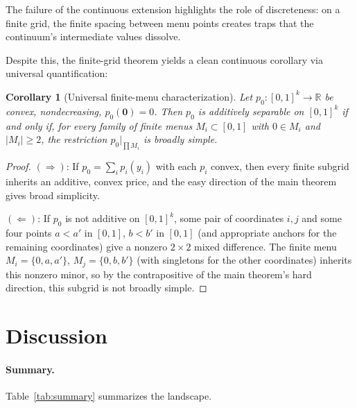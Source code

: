 \documentclass[11pt]{article}
\newtheorem{corollary}[theorem]{Corollary}
\newcommand{\R}{\mathbb{R}}
\begin{document}
The failure of the continuous extension highlights the role of
discreteness: on a finite grid, the finite spacing between menu
points creates traps that the continuum's intermediate values
dissolve.

Despite this, the finite-grid theorem yields a clean continuous
corollary via universal quantification:

\begin{corollary}[Universal finite-menu characterization]%
\label{cor:universal}
Let $p_0\colon [0,1]^k \to \R$ be convex, nondecreasing,
$p_0(\mathbf{0}) = 0$.  Then $p_0$ is additively separable on
$[0,1]^k$ if and only if, for every family of finite menus
$M_i \subset [0,1]$ with $0 \in M_i$ and $|M_i| \geq 2$, the
restriction $p_0|_{\prod M_i}$ is broadly simple.
\end{corollary}

\begin{proof}
$(\Rightarrow)$:
If $p_0 = \sum_i p_i(y_i)$ with each $p_i$ convex, then
every finite subgrid inherits an additive, convex price, and
the easy direction of the main theorem gives broad simplicity.

$(\Leftarrow)$:
If $p_0$ is not additive on $[0,1]^k$, some pair of coordinates
$i,j$ and some four points $a < a'$ in $[0,1]$, $b < b'$ in
$[0,1]$ (and appropriate anchors for the remaining coordinates)
give a nonzero $2 \times 2$ mixed difference.
The finite menu $M_i = \{0, a, a'\}$, $M_j = \{0, b, b'\}$
(with singletons for the other coordinates) inherits this
nonzero minor, so by the contrapositive of the main theorem's
hard direction, this subgrid is not broadly simple.
\end{proof}

\section{Discussion}\label{sec:discussion}

\paragraph{Summary.}
Table~\ref{tab:summary} summarizes the landscape.
\end{document}
